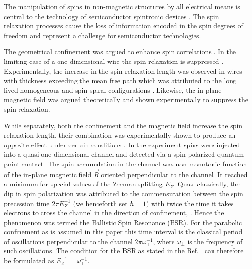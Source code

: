 \label{Chap2}
The manipulation of spins in non-magnetic structures by all electrical means is central to the technology of semiconductor spintronic devices \cite{Wolf2001,Awschalom2002,Hall2006,Awschalom2007}.
The spin relaxation processes cause the loss of information encoded in the spin degrees of freedom and represent a challenge for semiconductor technologies.

The geometrical confinement was argued to enhance spin correlations \cite{Bournel1998,Malshukov2000,Kiselev2000,Pareek2002}.
In the limiting case of a one-dimensional wire the spin relaxation is suppressed \cite{Schwab2006}. 
Experimentally, the increase in the spin relaxation length was observed in wires with thickness exceeding the mean free path \cite{Holleitner2006} which was attributed to the long lived homogeneous and spin spiral configurations \cite{Schwab2006,Chang2009,Froltsov2001,Pershin2005}.
Likewise, the in-plane magnetic field was argued theoretically \cite{Froltsov2001} and shown experimentally \cite{Meijer2004} to suppress the spin relaxation.



While separately, both the confinement and the magnetic field increase  the spin relaxation length,
their combination was experimentally shown to produce an opposite effect under certain conditions \cite{Frolov2009}.
In the experiment \cite{Frolov2009} spins were injected into a quasi-one-dimensional channel and detected via a spin-polarized quantum point contact.
The spin accumulation in the channel was non-monotonic function of the in-plane magnetic field $\vec{B}$ oriented perpendicular to the channel.
It reached a minimum for special values of the Zeeman splitting $E_Z$.
Quasi-classically, the dip in spin polarization was attributed to the commensuration between the spin precession time $2 \pi E_Z^{-1}$ (we henceforth set $\hbar = 1$) with twice the time it takes electrons to cross the channel in the direction of confinement, \cite{Luscher2010,Hachiya2014}.
Hence the phenomenon was termed the Ballistic Spin Resonance (BSR).
For the parabolic confinement as is assumed in this paper this time interval is the classical period of oscillations perpendicular to the channel $2 \pi \omega_{\perp}^{-1}$, where $\omega_{\perp}$ is the frequency of such oscillations.  
The condition for the BSR as stated in the Ref.~\cite{Luscher2010,Hachiya2014} can therefore be formulated as 
$E_Z^{-1} = \omega_{\perp}^{-1}$.




